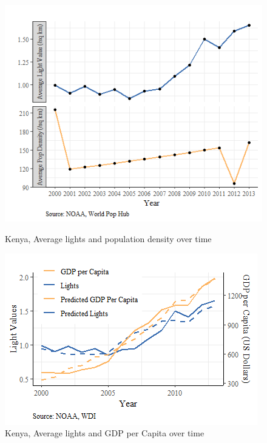 \begin{figure}
    \centering
    \begin{minipage}{0.45\textwidth}
    \includegraphics[scale = 0.55]{Graphics/Average lights and population density over time.png}
    \caption{Kenya, Average lights and population density over time}
    \end{minipage}
    \begin{minipage}{0.45\textwidth}
    \includegraphics[scale = 0.8]{Graphics/Kenya, Average lights and GDP per Capita over time.png}
    \caption{Kenya, Average lights and GDP per Capita over time}
    \label{fig:lightpoptime}
    \end{minipage}
\end{figure}



